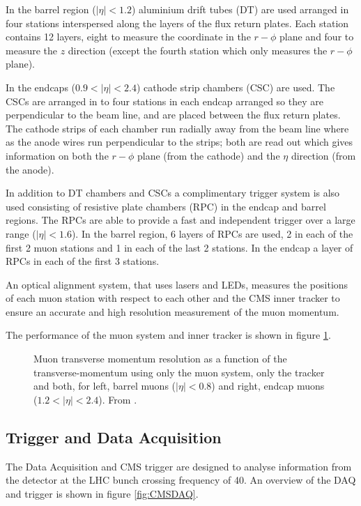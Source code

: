 In the barrel region ($|\eta| < 1.2$) aluminium drift tubes (DT) are used
arranged in four stations interspersed along the layers of the flux return
plates. 
Each station contains 12 layers, eight to measure the coordinate in the
$r-\phi$ plane and four to measure the $z$ direction (except the fourth station
which only measures the $r-\phi$ plane). 

In the endcaps ($0.9<|\eta|<2.4$) cathode strip chambers (CSC) are used. The
CSCs are arranged in to four stations in each endcap arranged so they are
perpendicular to the beam line, and are placed between the flux return plates.
The cathode strips of each chamber run radially away from the beam line where
as the anode wires run perpendicular to the strips; both are read out which
gives information on both the $r-\phi$ plane (from the cathode) and the $\eta$
direction (from the anode). \cite{cms}

In addition to DT chambers and CSCs a complimentary trigger system is also used
consisting of resistive plate chambers (RPC) in the endcap and barrel regions.
The RPCs are able to provide a fast and independent trigger over a large range
($|\eta| < 1.6$). In the barrel region, 6 layers of RPCs are used, 2 in each of
the first 2 muon stations and 1 in each of the last 2 stations. In the endcap a
layer of RPCs in each of the first 3 stations.

An optical alignment system, that uses lasers and LEDs, measures the positions
of each muon station with respect to each other and the CMS inner tracker to
ensure an accurate and high resolution measurement of the muon
momentum.\cite{cms}

The performance of the muon system and inner tracker is shown in figure
\ref{fig:MS}.

\begin{figure}[htb!]
  \centering
  \caption{Muon transverse momentum resolution as a function of the
  \label{fig:MS}
transverse-momentum using only the muon system, only the tracker and both, for
left, barrel muons ($|\eta| < 0.8$) and right, endcap muons ($1.2<|\eta| <
2.4$). From \cite{cms}.}
\end{figure}


\subsection{Trigger and Data Acquisition}
The Data Acquisition and CMS trigger are designed to analyse information from
the detector at the LHC bunch crossing frequency of
\unit{40}{\mega\hertz}\cite{lhc}.
An overview of the DAQ and trigger is shown in figure \ref{fig:CMSDAQ}.

